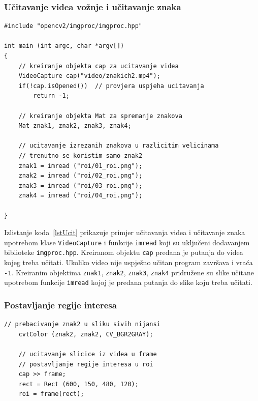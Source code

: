 \newpage
\subsubsection{Učitavanje videa vožnje i učitavanje znaka} %
\label{ssub:Učitavanje videa vožnje i učitavanje znaka}


\begin{lstlisting}[label=lstUcit,caption={Izvorni kod za učitavanje
videa i znaka}]
#include "opencv2/imgproc/imgproc.hpp"

int main (int argc, char *argv[])
{
    // kreiranje objekta cap za ucitavanje videa
    VideoCapture cap("video/znakich2.mp4");
    if(!cap.isOpened())  // provjera uspjeha ucitavanja
        return -1;

    // kreiranje objekta Mat za spremanje znakova
    Mat znak1, znak2, znak3, znak4;

    // ucitavanje izrezanih znakova u razlicitim velicinama
    // trenutno se koristim samo znak2 
    znak1 = imread ("roi/01_roi.png");      
    znak2 = imread ("roi/02_roi.png");
    znak3 = imread ("roi/03_roi.png");
    znak4 = imread ("roi/04_roi.png");

}
\end{lstlisting}

Izlistanje koda~\ref{lstUcit} prikazuje primjer učitavanja videa i
učitavanje znaka upotrebom klase \texttt{VideoCapture} i funkcije
\texttt{imread} koji su uključeni dodavanjem biblioteke
\texttt{imgproc.hpp}. Kreiranom objektu \texttt{cap} predana je putanja
do videa kojeg treba učitati. Ukoliko video nije uspješno učitan program
završava i vraća \texttt{-1}. Kreiranim objektima \texttt{znak1},
\texttt{znak2}, \texttt{znak3}, \texttt{znak4} pridružene su slike
učitane upotrebom funkcije \texttt{imread} kojoj je predana putanja do
slike koju treba učitati.


\newpage
\subsubsection{Postavljanje regije interesa} %
\label{ssub:Postavljanje regije interesa}


\begin{lstlisting}[label=lstRoi,caption={Izvorni kod za postvljanje
regije interesa}]
    // prebacivanje znak2 u sliku sivih nijansi
    cvtColor (znak2, znak2, CV_BGR2GRAY);
    
    // ucitavanje slicice iz videa u frame
    // postavljanje regije interesa u roi
    cap >> frame;
    rect = Rect (600, 150, 480, 120);
    roi = frame(rect);
    
\end{lstlisting}


